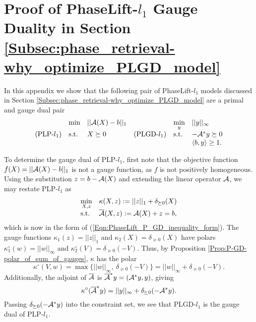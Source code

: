 \chapter{Proof of PhaseLift-$l_1$ Gauge Duality in Section \ref{Subsec:phase_retrieval-why_optimize_PLGD_model}} 	\label{Sec:Appx-PL-l1}

In this appendix we show that the following pair of PhaseLift-$l_1$ models discussed in Section \ref{Subsec:phase_retrieval-why_optimize_PLGD_model} are a primal and gauge dual pair
\begin{equation}				\label{Eqn:PhaseLift_l-1_norm_model_gauge_dual}
\begin{array}{llllll}
	&\min
	& ||{\mathcal A}(X) - b||_1
		&&\min\limits_{y}
			&	||y||_\infty
		\\
\textnormal{(PLP-}l_1) &	\textnormal{s.t.}
	&	X \succeq 0
		& \textnormal{(PLGD-}l_1)		
		&	\textnormal{s.t.}
			&	-{\mathcal A}^*y \succeq 0
		\\
	&&&&&	\langle b, y \rangle \geq 1.
\end{array}
\end{equation}

To determine the gauge dual of PLP-$l_1$, first note that the objective function $f(X) = ||{\mathcal A}(X) - b||_1$ is not a gauge function, as $f$ is not positively homogeneous.  Using the substitution $z = b - {\mathcal A}(X)$ and extending the linear operator ${\mathcal A}$, we may restate PLP-$l_1$ as
\begin{equation} 		\label{Eqn:PhaseLift_l-1_norm_model_general}
\begin{array}{ll}
\min\limits_{X, z}
	&	\kappa(X, z) := ||z||_1 + \delta_{\succeq 0}(X)
		\\
\textnormal{s.t.}
	&	\overline{{\mathcal A}}(X, z) := {\mathcal A}(X) + z = b,
\end{array}
\end{equation}
which is now in the form of (\ref{Eqn:PhaseLift_P_GD_inequality_form}).  The gauge functions $\kappa_1(z) = ||z||_1$ and $\kappa_2(X) = \delta_{\succeq 0}(X)$ have polars $\kappa_1^\circ(w) = ||w||_\infty$ and $\kappa_2^\circ(V) = \delta_{\succeq 0}(-V)$.  Thus, by Proposition \ref{Prop:P-GD-polar_of_sum_of_gauges}, $\kappa$ has the polar
\begin{equation}
\kappa^\circ(V, w) = \max \{ ||w||_\infty, \ \delta_{\succeq 0}(-V) \} = ||w||_\infty + \delta_{\succeq 0}(-V).
\end{equation}
Additionally, the adjoint of $\overline{{\mathcal A}}$ is $\overline{{\mathcal A}}^*y = ({\mathcal A}^*y, y)$, giving
\begin{equation}
\kappa^\circ(\overline{{\mathcal A}}^*y) = ||y||_\infty + \delta_{\succeq 0}(-{\mathcal A}^*y).
\end{equation}
Passing $\delta_{\succeq 0}(-{\mathcal A}^*y)$ into the constraint set, we see that PLGD-$l_1$ is the gauge dual of PLP-$l_1$.
